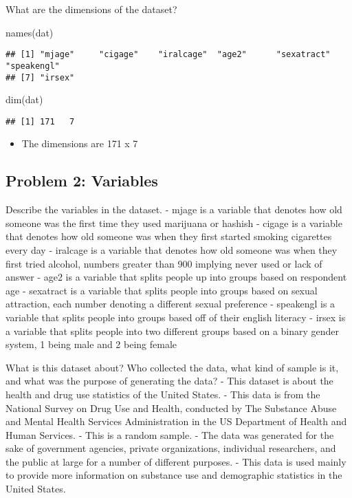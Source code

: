 \documentclass[
]{article}
\newenvironment{Shaded}{\begin{snugshade}}{\end{snugshade}}
\newcommand{\FunctionTok}[1]{\textcolor[rgb]{0.00,0.00,0.00}{#1}}
\newcommand{\NormalTok}[1]{#1}
\providecommand{\tightlist}{%
  \setlength{\itemsep}{0pt}\setlength{\parskip}{0pt}}
\begin{document}
What are the dimensions of the dataset?

\begin{Shaded}
\begin{Highlighting}[]
\FunctionTok{names}\NormalTok{(dat)}
\end{Highlighting}
\end{Shaded}

\begin{verbatim}
## [1] "mjage"     "cigage"    "iralcage"  "age2"      "sexatract" "speakengl"
## [7] "irsex"
\end{verbatim}

\begin{Shaded}
\begin{Highlighting}[]
\FunctionTok{dim}\NormalTok{(dat)}
\end{Highlighting}
\end{Shaded}

\begin{verbatim}
## [1] 171   7
\end{verbatim}

\begin{itemize}
\tightlist
\item
  The dimensions are 171 x 7
\end{itemize}

\hypertarget{problem-2-variables}{%
\subsection{Problem 2: Variables}\label{problem-2-variables}}

Describe the variables in the dataset. - mjage is a variable that
denotes how old someone was the first time they used marijuana or
hashish - cigage is a variable that denotes how old someone was when
they first started smoking cigarettes every day - iralcage is a variable
that denotes how old someone was when they first tried alcohol, numbers
greater than 900 implying never used or lack of answer - age2 is a
variable that splits people up into groups based on respondent age -
sexatract is a variable that splits people into groups based on sexual
attraction, each number denoting a different sexual preference -
speakengl is a variable that splits people into groups based off of
their english literacy - irsex is a variable that splits people into two
different groups based on a binary gender system, 1 being male and 2
being female

What is this dataset about? Who collected the data, what kind of sample
is it, and what was the purpose of generating the data? - This dataset
is about the health and drug use statistics of the United States. - This
data is from the National Survey on Drug Use and Health, conducted by
The Substance Abuse and Mental Health Services Administration in the US
Department of Health and Human Services. - This is a random sample. -
The data was generated for the sake of government agencies, private
organizations, individual researchers, and the public at large for a
number of different purposes. - This data is used mainly to provide more
information on substance use and demographic statistics in the United
States.
\end{document}
